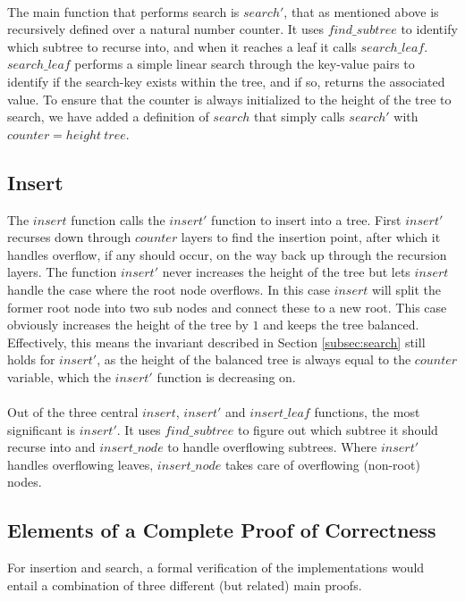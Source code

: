 \paragraph{}
The main function that performs search is $search'$, that as mentioned above is recursively defined over a natural number counter. It uses $find\_subtree$ to identify which subtree to recurse into, and when it reaches a leaf it calls $search\_leaf$. $search\_leaf$ performs a simple linear search through the key-value pairs to identify if the search-key exists within the tree, and if so, returns the associated value. To ensure that the counter is always initialized to the height of the tree to search, we have added a definition of $search$ that simply calls $search'$ with $counter = height~tree$.

\subsection{Insert}
The $insert$ function calls the $insert'$ function to insert into a tree. First $insert'$ recurses down through $counter$ layers to find the insertion point, after which it handles overflow, if any should occur, on the way back up through the recursion layers. The function $insert'$ never increases the height of the tree but lets $insert$ handle the case where the root node overflows. In this case $insert$ will split the former root node into two sub nodes and connect these to a new root. This case obviously increases the height of the tree by $1$ and keeps the tree balanced. Effectively, this means the invariant described in Section \ref{subsec:search} still holds for $insert'$, as the height of the balanced tree is always equal to the $counter$ variable, which the $insert'$ function is decreasing on.

\paragraph{}
Out of the three central $insert$, $insert'$ and $insert\_leaf$ functions, the most significant is $insert'$. It uses $find\_subtree$ to figure out which subtree it should recurse into and $insert\_node$ to handle overflowing subtrees. Where $insert'$ handles overflowing leaves, $insert\_node$ takes care of overflowing (non-root) nodes.

\subsection{Elements of a Complete Proof of Correctness}
\label{sec:ElementsOfACompleteProof}
For insertion and search, a formal verification of the implementations would entail a combination of three different (but related) main proofs.

